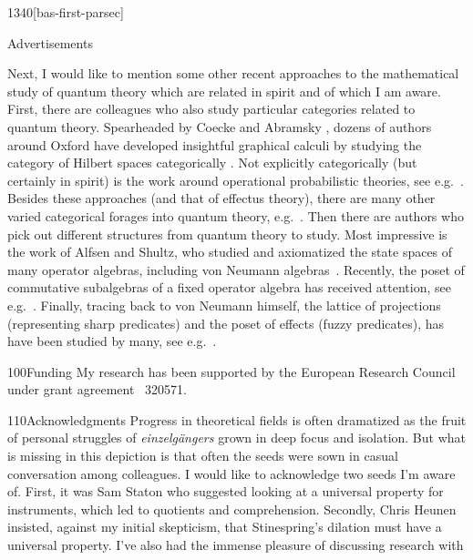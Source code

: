 \begin{parsec}{1340}[bas-first-parsec]
\begin{point}{80}{Advertisements}
\begin{point}{90}
Next, I would like to mention some other recent approaches
    to the mathematical study of quantum theory
        which are related in spirit and of which I am aware.
First, there are colleagues who also study particular categories
    related to quantum theory.
Spearheaded by Coecke and Abramsky \cite{abramsky2004categorical},
    dozens of authors around Oxford
    have developed insightful graphical calculi
    by studying the category of Hilbert spaces
    categorically \cite{coecke2017picturing}.
Not explicitly categorically (but certainly in spirit)
    is the work around operational probabilistic theories,
    see e.g.~\cite{DAriano2016}.
Besides these approaches (and that of effectus theory),
    there are many other varied categorical forages
    into quantum theory, e.g.~\cite{kornell2012,rennela2017infinite,staton,furber2013kleisli}.
Then there are authors who pick out different structures from quantum theory
    to study.
Most impressive is the work of Alfsen and Shultz,
    who studied and axiomatized the state
    spaces of many operator algebras, including von Neumann algebras~\cite{alfsen2012}.
Recently, the poset of commutative subalgebras of a fixed operator algebra
    has received attention,
    see e.g.~\cite{heunen2015domains,bert,heunen2012bohrification}.
Finally,
    tracing back to von Neumann himself,
    the lattice of projections (representing sharp predicates)
    and the poset of effects (fuzzy predicates),
    has have been studied by many, see e.g.~\cite{dvurecenskij2013new}.
\end{point}
\end{point}
\begin{point}{100}{Funding}
My research has been supported by the
European Research Council under grant agreement \textnumero~320571.
\end{point}
\begin{point}{110}{Acknowledgments}%
Progress in theoretical fields
    is often dramatized
    as the fruit of personal struggles of  \emph{einzelg\"angers}
    grown in deep focus and isolation.
But what is missing in this depiction is that
    often the seeds were sown
    in casual conversation among colleagues.
I would like to acknowledge two seeds I'm aware of.
First, it was Sam Staton who suggested looking at a universal property
    for instruments, which led to quotients and comprehension.
Secondly, Chris Heunen insisted,
    against my initial skepticism,
    that Stinespring's dilation must have a
    universal property.
I've also had the immense pleasure of discussing research with

\end{point}
\end{parsec}

